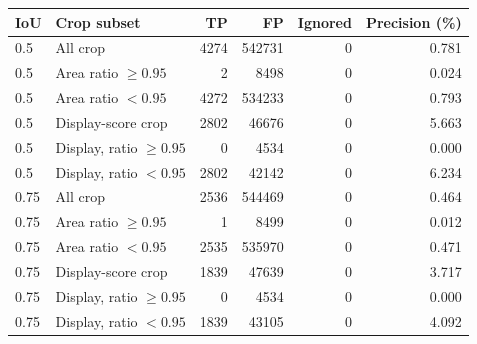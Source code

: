 \begin{tabular}{llrrrr}
\toprule
IoU & Crop subset & TP & FP & Ignored & Precision (\%)\\
\midrule
0.5 & All crop & 4274 & 542731 & 0 & 0.781\\
0.5 & Area ratio $\geq0.95$ & 2 & 8498 & 0 & 0.024\\
0.5 & Area ratio $<0.95$ & 4272 & 534233 & 0 & 0.793\\
0.5 & Display-score crop & 2802 & 46676 & 0 & 5.663\\
0.5 & Display, ratio $\geq0.95$ & 0 & 4534 & 0 & 0.000\\
0.5 & Display, ratio $<0.95$ & 2802 & 42142 & 0 & 6.234\\
0.75 & All crop & 2536 & 544469 & 0 & 0.464\\
0.75 & Area ratio $\geq0.95$ & 1 & 8499 & 0 & 0.012\\
0.75 & Area ratio $<0.95$ & 2535 & 535970 & 0 & 0.471\\
0.75 & Display-score crop & 1839 & 47639 & 0 & 3.717\\
0.75 & Display, ratio $\geq0.95$ & 0 & 4534 & 0 & 0.000\\
0.75 & Display, ratio $<0.95$ & 1839 & 43105 & 0 & 4.092\\
\bottomrule
\end{tabular}
